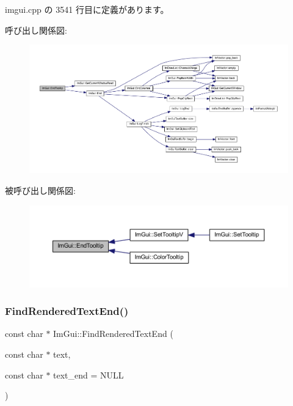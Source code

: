  imgui.\+cpp の 3541 行目に定義があります。

呼び出し関係図\+:\nopagebreak
\begin{figure}[H]
\begin{center}
\leavevmode
\includegraphics[width=350pt]{namespace_im_gui_ac8d75c160cfdf43d512f773ca133a1c6_cgraph}
\end{center}
\end{figure}
被呼び出し関係図\+:\nopagebreak
\begin{figure}[H]
\begin{center}
\leavevmode
\includegraphics[width=350pt]{namespace_im_gui_ac8d75c160cfdf43d512f773ca133a1c6_icgraph}
\end{center}
\end{figure}
\mbox{\label{namespace_im_gui_a7671e1dbc803a31b06081b52a771d83f}} 
\subsubsection{\texorpdfstring{Find\+Rendered\+Text\+End()}{FindRenderedTextEnd()}}
{\footnotesize\ttfamily const char $\ast$ Im\+Gui\+::\+Find\+Rendered\+Text\+End (\begin{DoxyParamCaption}\item[{const char $\ast$}]{text,  }\item[{const char $\ast$}]{text\+\_\+end = {\ttfamily NULL} }\end{DoxyParamCaption})}




